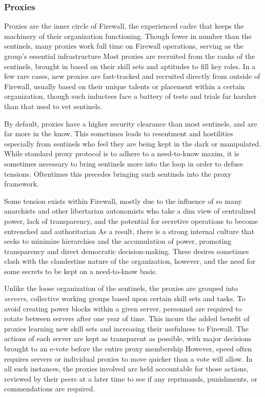 \subsubsection{Proxies }

Proxies are the inner circle of Firewall, the experienced 
cadre that keeps the machinery of their organization
functioning. Though fewer in number than the
sentinels, many proxies work full time on Firewall 
operations, serving as the group's essential infrastructure
Most proxies are recruited from the ranks of the
sentinels, brought in based on their skill sets and aptitudes
to fill key roles. In a few rare cases, new proxies
are fast-tracked and recruited directly from outside 
of Firewall, usually based on their unique talents or 
placement within a certain organization, though such 
inductees face a battery of tests and trials far harsher 
than that used to vet sentinels.

By default, proxies have a higher security clearance
than most sentinels, and are far more in the
know. This sometimes leads to resentment and hostilities
especially from sentinels who feel they are
being kept in the dark or manipulated. While standard
proxy protocol is to adhere to a need-to-know
maxim, it is sometimes necessary to bring sentinels 
more into the loop in order to defuse tensions. Oftentimes
this precedes bringing such sentinels into
the proxy framework.

Some tension exists within Firewall, mostly due to 
the influence of so many anarchists and other libertarian
autonomists who take a dim view of centralized
power, lack of transparency, and the potential for secretive
operations to become entrenched and authoritarian
As a result, there is a strong internal culture
that seeks to minimize hierarchies and the accumulation
of power, promoting transparency and direct
democratic decision-making. These desires sometimes 
clash with the clandestine nature of the organization, 
however, and the need for some secrets to be kept on 
a need-to-know basis. 

Unlike the loose organization of the sentinels, the 
proxies are grouped into \textit{servers,} collective working 
groups based upon certain skill sets and tasks. To 
avoid creating power blocks within a given server, 
personnel are required to rotate between servers 
after one year of time. This incurs the added benefit 
of proxies learning new skill sets and increasing their 
usefulness to Firewall. The actions of each server are 
kept as transparent as possible, with major decisions 
brought to an e-vote before the entire proxy membership
However, speed often requires servers or individual
proxies to move quicker than a vote will allow.
In all such instances, the proxies involved are held 
accountable for those actions, reviewed by their peers 
at a later time to see if any reprimands, punishments, 
or commendations are required.

